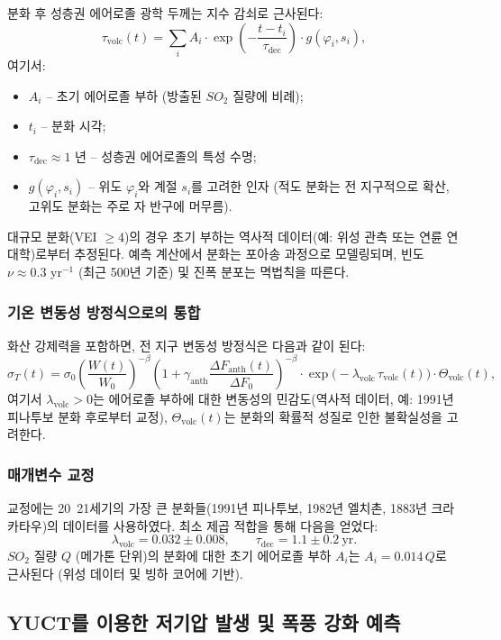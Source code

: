 \documentclass[11pt,a4paper]{article}
\begin{document}
	분화 후 성층권 에어로졸 광학 두께는 지수 감쇠로 근사된다:
	\[
	\tau_{\text{volc}}(t) = \sum_{i} A_i \cdot \exp\!\left(-\frac{t-t_i}{\tau_{\text{dec}}}\right) \cdot g(\varphi_i, s_i),
	\]
	여기서:
	\begin{itemize}
		\item $A_i$ – 초기 에어로졸 부하 (방출된 $SO_2$ 질량에 비례);
		\item $t_i$ – 분화 시각;
		\item $\tau_{\text{dec}} \approx 1$ 년 – 성층권 에어로졸의 특성 수명;
		\item $g(\varphi_i, s_i)$ – 위도 $\varphi_i$와 계절 $s_i$를 고려한 인자 (적도 분화는 전 지구적으로 확산, 고위도 분화는 주로 자 반구에 머무름).
	\end{itemize}
	
	대규모 분화(VEI $\ge 4$)의 경우 초기 부하는 역사적 데이터(예: 위성 관측 또는 연륜 연대학)로부터 추정된다. 예측 계산에서 분화는 포아송 과정으로 모델링되며, 빈도 $\nu \approx 0.3$ yr$^{-1}$ (최근 500년 기준) 및 진폭 분포는 멱법칙을 따른다.
	
	\subsubsection{기온 변동성 방정식으로의 통합}
	
	화산 강제력을 포함하면, 전 지구 변동성 방정식은 다음과 같이 된다:
	\[
	\sigma_T(t) = \sigma_0 \left( \frac{W(t)}{W_0} \right)^{-\beta}
	\left(1 + \gamma_{\text{anth}} \frac{\Delta F_{\text{anth}}(t)}{\Delta F_0}\right)^{-\beta}
	\cdot \exp\!\bigl(-\lambda_{\text{volc}} \,\tau_{\text{volc}}(t)\bigr) \cdot \Theta_{\text{volc}}(t),
	\]
	여기서 $\lambda_{\text{volc}} > 0$는 에어로졸 부하에 대한 변동성의 민감도(역사적 데이터, 예: 1991년 피나투보 분화 후로부터 교정), $\Theta_{\text{volc}}(t)$는 분화의 확률적 성질로 인한 불확실성을 고려한다.
	
	\subsubsection{매개변수 교정}
	
	교정에는 20~21세기의 가장 큰 분화들(1991년 피나투보, 1982년 엘치촌, 1883년 크라카타우)의 데이터를 사용하였다. 최소 제곱 적합을 통해 다음을 얻었다:
	\[
	\lambda_{\text{volc}} = 0.032 \pm 0.008, \qquad \tau_{\text{dec}} = 1.1 \pm 0.2\ \text{yr}.
	\]
	$SO_2$ 질량 $Q$ (메가톤 단위)의 분화에 대한 초기 에어로졸 부하 $A_i$는 $A_i = 0.014\,Q$로 근사된다 (위성 데이터 및 빙하 코어에 기반).
	
	\subsection{YUCT를 이용한 저기압 발생 및 폭풍 강화 예측}
	\label{subsec:cyclone_prediction}
	
\end{document}
